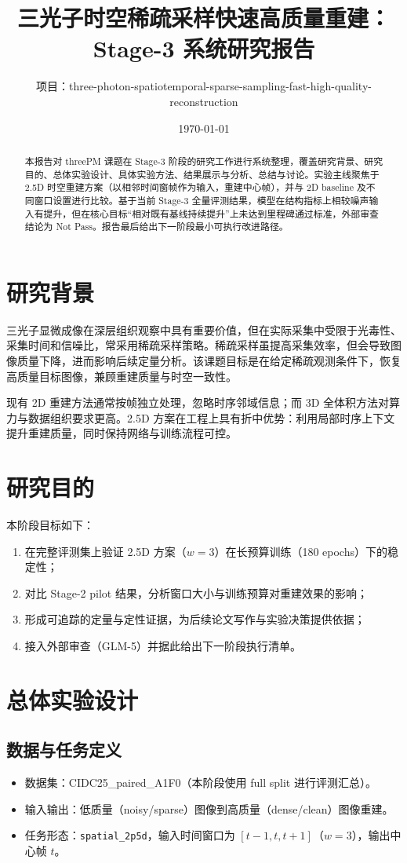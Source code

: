\documentclass[11pt,a4paper]{article}
\title{三光子时空稀疏采样快速高质量重建：Stage-3 系统研究报告}
\author{项目：three-photon-spatiotemporal-sparse-sampling-fast-high-quality-reconstruction}
\date{\today}
\begin{document}
\maketitle

\begin{abstract}
本报告对 threePM 课题在 Stage-3 阶段的研究工作进行系统整理，覆盖研究背景、研究目的、总体实验设计、具体实验方法、结果展示与分析、总结与讨论。实验主线聚焦于 2.5D 时空重建方案（以相邻时间窗帧作为输入，重建中心帧），并与 2D baseline 及不同窗口设置进行比较。基于当前 Stage-3 全量评测结果，模型在结构指标上相较噪声输入有提升，但在核心目标“相对既有基线持续提升”上未达到里程碑通过标准，外部审查结论为 Not Pass。报告最后给出下一阶段最小可执行改进路径。
\end{abstract}

\section{研究背景}
三光子显微成像在深层组织观察中具有重要价值，但在实际采集中受限于光毒性、采集时间和信噪比，常采用稀疏采样策略。稀疏采样虽提高采集效率，但会导致图像质量下降，进而影响后续定量分析。该课题目标是在给定稀疏观测条件下，恢复高质量目标图像，兼顾重建质量与时空一致性。

现有 2D 重建方法通常按帧独立处理，忽略时序邻域信息；而 3D 全体积方法对算力与数据组织要求更高。2.5D 方案在工程上具有折中优势：利用局部时序上下文提升重建质量，同时保持网络与训练流程可控。

\section{研究目的}
本阶段目标如下：
\begin{enumerate}[leftmargin=2em]
    \item 在完整评测集上验证 2.5D 方案（$w=3$）在长预算训练（180 epochs）下的稳定性；
    \item 对比 Stage-2 pilot 结果，分析窗口大小与训练预算对重建效果的影响；
    \item 形成可追踪的定量与定性证据，为后续论文写作与实验决策提供依据；
    \item 接入外部审查（GLM-5）并据此给出下一阶段执行清单。
\end{enumerate}

\section{总体实验设计}
\subsection{数据与任务定义}
\begin{itemize}[leftmargin=2em]
    \item 数据集：CIDC25\_paired\_A1F0（本阶段使用 full split 进行评测汇总）。
    \item 输入输出：低质量（noisy/sparse）图像到高质量（dense/clean）图像重建。
    \item 任务形态：\texttt{spatial\_2p5d}，输入时间窗口为 $[t-1,t,t+1]$（$w=3$），输出中心帧 $t$。
\end{itemize}
\end{document}
